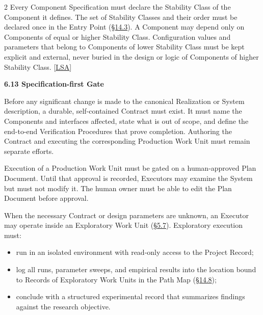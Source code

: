 \begin{multicols}{2}
Every Component Specification must declare the Stability Class of the Component it defines. The set of Stability Classes and their order must be declared once in the Entry Point (\hyperlink{nss-14.3}{\S14.3}). A Component may depend only on Components of equal or higher Stability Class. Configuration values and parameters that belong to Components of lower Stability Class must be kept explicit and external, never buried in the design or logic of Components of higher Stability Class. [\hyperlink{gp-LSA}{LSA}]

\hypertarget{nss-6.13}{}

\par\smallskip\noindent\textbf{6.13 Specification-first Gate}\par\nopagebreak

Before any significant change is made to the canonical Realization or System description, a durable, self-contained Contract must exist. It must name the Components and interfaces affected, state what is out of scope, and define the end-to-end Verification Procedures that prove completion. Authoring the Contract and executing the corresponding Production Work Unit must remain separate efforts.

Execution of a Production Work Unit must be gated on a human-approved Plan Document. Until that approval is recorded, Executors may examine the System but must not modify it. The human owner must be able to edit the Plan Document before approval.

When the necessary Contract or design parameters are unknown, an Executor may operate inside an Exploratory Work Unit (\hyperlink{nss-5.7}{\S5.7}). Exploratory execution must:

\begin{itemize}\setlength{\itemsep}{0pt}\setlength{\parskip}{0pt}

\item run in an isolated environment with read-only access to the Project Record;

\item log all runs, parameter sweeps, and empirical results into the location bound to Records of Exploratory Work Units in the Path Map (\hyperlink{nss-14.8}{\S14.8});

\item conclude with a structured experimental record that summarizes findings against the research objective.

\end{itemize}


\end{multicols}
